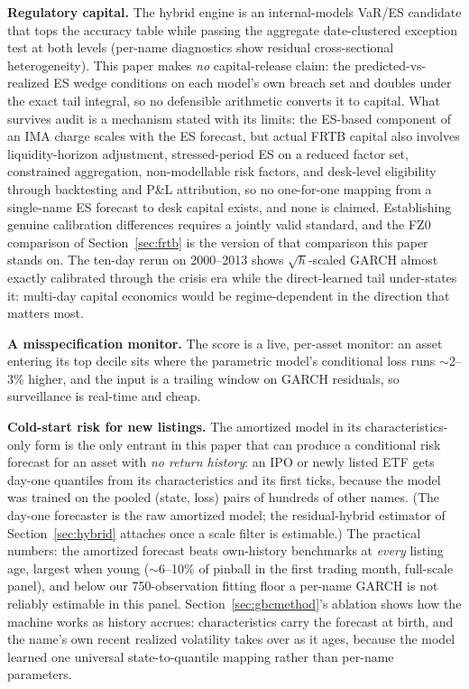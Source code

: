 \documentclass[11pt]{article}
\theoremstyle{remark}
\begin{document}
\textbf{Regulatory capital.} The
hybrid engine is an internal-models VaR/ES candidate that tops the
accuracy table while passing the aggregate date-clustered exception
test at both levels (per-name diagnostics show residual
cross-sectional heterogeneity). This paper makes \emph{no}
capital-release claim: the predicted-vs-realized ES wedge conditions
on each model's own breach set and doubles under the exact tail
integral, so no defensible arithmetic converts it to capital. What survives
audit is a mechanism stated with its limits: the ES-based component
of an IMA charge scales with the ES forecast, but actual FRTB capital
also involves liquidity-horizon adjustment, stressed-period ES on a
reduced factor set, constrained aggregation, non-modellable risk
factors, and desk-level eligibility through backtesting and P\&L attribution, so no one-for-one mapping from a single-name ES
forecast to desk capital exists, and none is claimed. Establishing
genuine calibration differences requires a jointly valid standard,
and the FZ0 comparison of Section~\ref{sec:frtb} is the version of
that comparison this paper stands on. The ten-day rerun on
2000--2013 shows $\sqrt{h}$-scaled GARCH almost exactly calibrated
through the crisis era while the direct-learned tail under-states it:
multi-day capital economics would be regime-dependent in the direction
that matters most.

\textbf{A misspecification monitor.} The score is a live, per-asset
monitor: an asset entering its top decile sits where the parametric
model's conditional loss runs $\sim$2--3\% higher, and the input is a
trailing window on GARCH residuals, so surveillance is real-time and
cheap.

\textbf{Cold-start risk for new listings.} The amortized model in its
characteristics-only form is the
only entrant in this paper that can produce a conditional risk forecast
for an asset with \emph{no return history}: an IPO or newly listed
ETF gets day-one quantiles from its characteristics and
its first ticks, because the model was trained on the pooled
(state, loss) pairs of hundreds of other names. (The day-one forecaster is the raw amortized model; the
residual-hybrid estimator of Section~\ref{sec:hybrid} attaches once a
scale filter is estimable.) The practical numbers:
the amortized forecast beats own-history benchmarks at \emph{every}
listing age, largest when young ($\sim$6--10\% of pinball in the
first trading month, full-scale panel), and below our
750-observation fitting floor a per-name GARCH is not reliably
estimable in this panel. Section~\ref{sec:gbcmethod}'s ablation shows
how the machine works as history accrues: characteristics carry the forecast at birth, and
the name's own recent realized volatility takes over as it ages,
because the model learned one universal state-to-quantile mapping
rather than per-name parameters.
\end{document}
